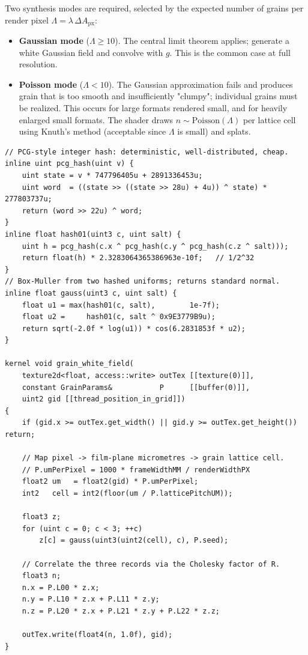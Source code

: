 Two synthesis modes are required, selected by the expected number of grains per
render pixel $\Lambda = \lambda\,\Delta A_{\mathrm{px}}$:

\begin{itemize}
\item \textbf{Gaussian mode} ($\Lambda \geq 10$). The central limit theorem
applies; generate a white Gaussian field and convolve with $g$. This is the
common case at full resolution.
\item \textbf{Poisson mode} ($\Lambda < 10$). The Gaussian approximation fails
and produces grain that is too smooth and insufficiently "clumpy"; individual
grains must be realized. This occurs for large formats rendered small, and for
heavily enlarged small formats. The shader draws $n \sim \mathrm{Poisson}(\Lambda)$
per lattice cell using Knuth's method \cite{knuth1997} (acceptable since
$\Lambda$ is small) and splats.
\end{itemize}

\begin{lstlisting}[language=Metal, caption={Deterministic hash and grain field generation (Gaussian mode).}, label={lst:grain}]
// PCG-style integer hash: deterministic, well-distributed, cheap.
inline uint pcg_hash(uint v) {
    uint state = v * 747796405u + 2891336453u;
    uint word  = ((state >> ((state >> 28u) + 4u)) ^ state) * 277803737u;
    return (word >> 22u) ^ word;
}
inline float hash01(uint3 c, uint salt) {
    uint h = pcg_hash(c.x ^ pcg_hash(c.y ^ pcg_hash(c.z ^ salt)));
    return float(h) * 2.3283064365386963e-10f;   // 1/2^32
}
// Box-Muller from two hashed uniforms; returns standard normal.
inline float gauss(uint3 c, uint salt) {
    float u1 = max(hash01(c, salt),        1e-7f);
    float u2 =     hash01(c, salt ^ 0x9E3779B9u);
    return sqrt(-2.0f * log(u1)) * cos(6.2831853f * u2);
}

kernel void grain_white_field(
    texture2d<float, access::write> outTex [[texture(0)]],
    constant GrainParams&           P      [[buffer(0)]],
    uint2 gid [[thread_position_in_grid]])
{
    if (gid.x >= outTex.get_width() || gid.y >= outTex.get_height()) return;

    // Map pixel -> film-plane micrometres -> grain lattice cell.
    // P.umPerPixel = 1000 * frameWidthMM / renderWidthPX
    float2 um   = float2(gid) * P.umPerPixel;
    int2   cell = int2(floor(um / P.latticePitchUM));

    float3 z;
    for (uint c = 0; c < 3; ++c)
        z[c] = gauss(uint3(uint2(cell), c), P.seed);

    // Correlate the three records via the Cholesky factor of R.
    float3 n;
    n.x = P.L00 * z.x;
    n.y = P.L10 * z.x + P.L11 * z.y;
    n.z = P.L20 * z.x + P.L21 * z.y + P.L22 * z.z;

    outTex.write(float4(n, 1.0f), gid);
}
\end{lstlisting}

